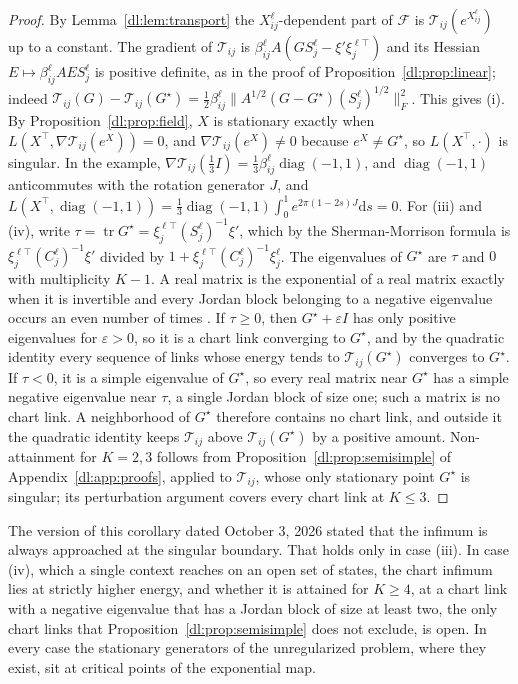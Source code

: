 \documentclass[11pt]{article}
\theoremstyle{definition}
\theoremstyle{remark}
\providecommand{\tr}{\operatorname{tr}}
\begin{document}
\begin{proof}
By Lemma~\ref{dl:lem:transport} the $X_{ij}^\ell$-dependent part of $\mathcal F$ is $\mathcal T_{ij}(e^{X_{ij}^\ell})$ up to a constant. The gradient of $\mathcal T_{ij}$ is $\beta_{ij}^\ell A(GS_j^\ell-\xi'\xi_j^{\ell\top})$ and its Hessian $E\mapsto\beta_{ij}^\ell AES_j^\ell$ is positive definite, as in the proof of Proposition~\ref{dl:prop:linear}; indeed $\mathcal T_{ij}(G)-\mathcal T_{ij}(G^\star)=\tfrac12\beta_{ij}^\ell\|A^{1/2}(G-G^\star)(S_j^\ell)^{1/2}\|_F^2$. This gives (i). By Proposition~\ref{dl:prop:field}, $X$ is stationary exactly when $L(X^\top,\nabla\mathcal T_{ij}(e^X))=0$, and $\nabla\mathcal T_{ij}(e^X)\ne0$ because $e^X\ne G^\star$, so $L(X^\top,\cdot)$ is singular. In the example, $\nabla\mathcal T_{ij}(\tfrac13I)=\tfrac13\beta_{ij}^\ell\operatorname{diag}(-1,1)$, and $\operatorname{diag}(-1,1)$ anticommutes with the rotation generator $J$, and $L(X^\top,\operatorname{diag}(-1,1))=\tfrac13\operatorname{diag}(-1,1)\int_0^1e^{2\pi(1-2s)J}\mathrm ds=0$. For (iii) and (iv), write $\tau=\tr G^\star=\xi_j^{\ell\top}(S_j^\ell)^{-1}\xi'$, which by the Sherman-Morrison formula is $\xi_j^{\ell\top}(C_j^\ell)^{-1}\xi'$ divided by $1+\xi_j^{\ell\top}(C_j^\ell)^{-1}\xi_j^\ell$. The eigenvalues of $G^\star$ are $\tau$ and $0$ with multiplicity $K-1$. A real matrix is the exponential of a real matrix exactly when it is invertible and every Jordan block belonging to a negative eigenvalue occurs an even number of times \cite[Theorem~1]{dl:culver1966}. If $\tau\ge0$, then $G^\star+\varepsilon I$ has only positive eigenvalues for $\varepsilon>0$, so it is a chart link converging to $G^\star$, and by the quadratic identity every sequence of links whose energy tends to $\mathcal T_{ij}(G^\star)$ converges to $G^\star$. If $\tau<0$, it is a simple eigenvalue of $G^\star$, so every real matrix near $G^\star$ has a simple negative eigenvalue near $\tau$, a single Jordan block of size one; such a matrix is no chart link. A neighborhood of $G^\star$ therefore contains no chart link, and outside it the quadratic identity keeps $\mathcal T_{ij}$ above $\mathcal T_{ij}(G^\star)$ by a positive amount. Non-attainment for $K=2,3$ follows from Proposition~\ref{dl:prop:semisimple} of Appendix~\ref{dl:app:proofs}, applied to $\mathcal T_{ij}$, whose only stationary point $G^\star$ is singular; its perturbation argument covers every chart link at $K\le3$.
\end{proof}

The version of this corollary dated October 3, 2026 stated that the infimum is always approached at the singular boundary. That holds only in case (iii). In case (iv), which a single context reaches on an open set of states, the chart infimum lies at strictly higher energy, and whether it is attained for $K\ge4$, at a chart link with a negative eigenvalue that has a Jordan block of size at least two, the only chart links that Proposition~\ref{dl:prop:semisimple} does not exclude, is open. In every case the stationary generators of the unregularized problem, where they exist, sit at critical points of the exponential map.
\end{document}
